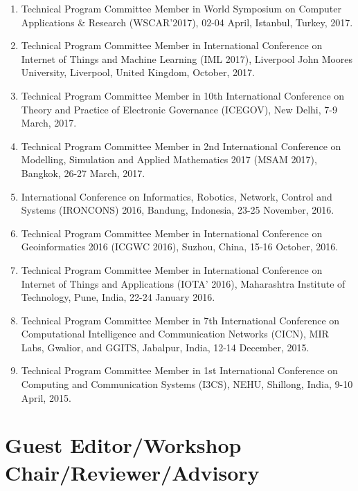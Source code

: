 \documentclass[11pt,a4paper]{moderncv}
\begin{document}
\begin{adjustwidth}{6em}{0pt}
\begin{enumerate}
		\item Technical Program Committee Member in World Symposium on Computer Applications \& Research (WSCAR’2017), 02-04 April, Istanbul, Turkey, 2017.
		
		\item Technical Program Committee Member in International Conference on Internet of Things and Machine Learning (IML 2017), Liverpool John Moores University, Liverpool, United Kingdom, October, 2017.
		
		\item Technical Program Committee Member in 10th International Conference on Theory and Practice of Electronic Governance (ICEGOV), New Delhi, 7-9 March, 2017.
		
		\item Technical Program Committee Member in 2nd International Conference on Modelling, Simulation and Applied Mathematics 2017 (MSAM 2017), Bangkok, 26-27 March, 2017.
		
		\item International Conference on Informatics, Robotics, Network, Control and Systems (IRONCONS) 2016, Bandung, Indonesia, 23-25 November, 2016.
		
		\item Technical Program Committee Member in International Conference on Geoinformatics 2016 (ICGWC 2016), Suzhou, China, 15-16 October, 2016.
		
		\item Technical Program Committee Member in International Conference on Internet of Things and Applications (IOTA' 2016), Maharashtra Institute of Technology, Pune, India, 22-24 January 2016.
		
		\item Technical Program Committee Member in 7th International Conference on Computational Intelligence and Communication Networks (CICN), MIR Labs, Gwalior, and GGITS, Jabalpur, India, 12-14 December, 2015.
		
		\item Technical Program Committee Member in 1st International Conference on Computing and Communication Systems (I3CS), NEHU, Shillong, India, 9-10 April, 2015.
		
		
		
	\end{enumerate}
\end{adjustwidth}





\section{\textbf{Guest Editor/Workshop Chair/Reviewer/Advisory}}
\end{document}

